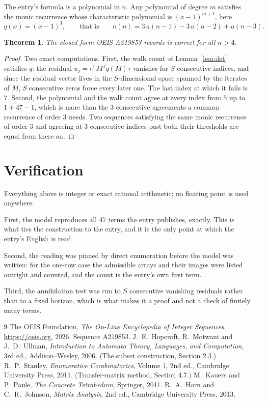 \documentclass[11pt,a4paper]{article}
\theoremstyle{plain}
\newtheorem{theorem}{Theorem}
\theoremstyle{definition}
\begin{document}
The entry's formula is a polynomial in $n$. Any polynomial of degree $m$ satisfies the monic
recurrence whose characteristic polynomial is $(x-1)^{m+1}$, here
\[
q(x)=(x-1)^{3},\qquad\text{that is}\qquad a(n)=3\,a(n-1) - 3\,a(n-2) + a(n-3).
\]

\begin{theorem}
The closed form OEIS A219853 records is correct for all $n>4$.
\end{theorem}

\begin{proof}
Two exact computations. First, the walk count of Lemma~\ref{lem:det} satisfies $q$: the
residual $u_j=\iota^{\!\top}M^{\,j}q(M)\tau$ vanishes for $S$ consecutive indices, and
since the residual vector lives in the $S$-dimensional space spanned by the iterates of $M$,
$S$ consecutive zeros force every later one. The last index at which it fails is $7$.
Second, the polynomial and the walk count agree at every index from $5$ up to
$1 + 47 - 1$, which is more than the $3$ consecutive agreements a
common recurrence of order $3$ needs. Two sequences satisfying the same monic recurrence
of order $3$ and agreeing at $3$ consecutive indices past both their thresholds are
equal from there on.
\end{proof}

\section{Verification}

Everything above is integer or exact rational arithmetic; no floating point is used anywhere.

First, the model reproduces all $47$ terms the entry publishes, exactly. This is what
ties the construction to the entry, and it is the only point at which the entry's English is
read.

Second, the reading was pinned by direct enumeration before the model was written: for the
one-row case the admissible arrays and their images were listed outright and counted, and the
count is the entry's own first term.

Third, the annihilation test was run to $S$ consecutive vanishing residuals rather than to a
fixed horizon, which is what makes it a proof and not a check of finitely many terms.

\begin{thebibliography}{9}
 The OEIS Foundation, \emph{The On-Line Encyclopedia of Integer
Sequences}, \url{https://oeis.org}, 2026. Sequence A219853.
 J.~E.~Hopcroft, R.~Motwani and J.~D.~Ullman, \emph{Introduction to Automata
Theory, Languages, and Computation}, 3rd ed., Addison--Wesley, 2006. (The subset
construction, Section 2.3.)
 R.~P.~Stanley, \emph{Enumerative Combinatorics}, Volume 1, 2nd ed.,
Cambridge University Press, 2011. (Transfer-matrix method, Section 4.7.)
 M.~Kauers and P.~Paule, \emph{The Concrete Tetrahedron}, Springer, 2011.
 R.~A.~Horn and C.~R.~Johnson, \emph{Matrix Analysis}, 2nd ed., Cambridge
University Press, 2013.
\end{thebibliography}
\end{document}
